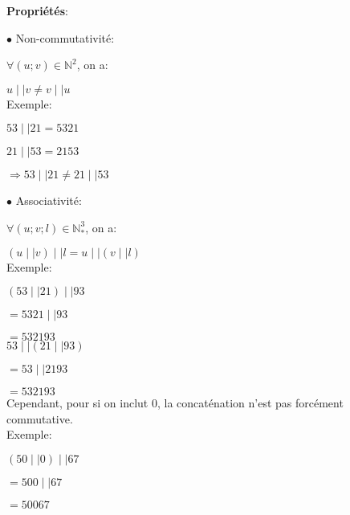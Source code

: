 \documentclass[a4paper, 12pt]{article}
\begin{document}
\noindent \textbf{Propriétés}:

\noindent $\bullet$ Non-commutativité:

$\forall \left( u; v \right) \in \mathbb{N}^{2}$, on a:

$u \mid\mid v \neq v \mid\mid u$ \\

Exemple:

\hspace{\parindent} $53 \mid\mid 21 = 5321$

\hspace{\parindent} $21 \mid\mid 53 = 2153$

\hspace{\parindent} $\Rightarrow 53 \mid\mid 21 \neq 21 \mid\mid 53$


\newpage

\noindent $\bullet$ Associativité:

$\forall \left( u; v; l \right) \in \mathbb{N}^{3}_{*}$, on a:

$\left( u \mid\mid v \right) \mid\mid l = u \mid\mid \left( v \mid\mid l \right)$ \\

Exemple:

\hspace{\parindent} $\left( 53 \mid\mid 21 \right) \mid\mid 93$

\hspace{\parindent} $= 5321 \mid\mid 93$

\hspace{\parindent} $= 532193$ \\

\hspace{\parindent} $53 \mid\mid \left( 21 \mid\mid 93 \right)$

\hspace{\parindent} $= 53 \mid\mid 2193$

\hspace{\parindent} $= 532193$ \\

Cependant, pour si on inclut 0, la concaténation n'est pas forcément commutative. \\

Exemple:

\hspace{\parindent} $\left( 50 \mid\mid 0 \right) \mid\mid 67$

\hspace{\parindent} $= 500 \mid\mid 67$

\hspace{\parindent} $= 50067$ \\
\end{document}
